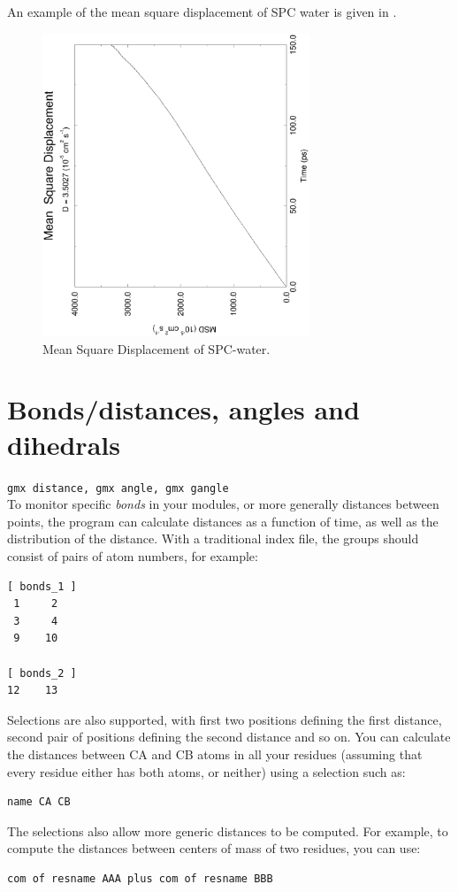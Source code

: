 An example of the mean square displacement of SPC water is given in
.

\begin{figure}
\centerline{
{\includegraphics[width=8cm]{plots/msdwater}}}
\caption{Mean Square Displacement of SPC-water.}
\label{fig:msdwater}
\end{figure}

% 
% 
\section{Bonds/distances, angles and dihedrals}
\label{sec:bad}
{\tt gmx distance, gmx angle, gmx gangle}\\
To monitor specific {\em bonds} in your modules, or more generally
distances between points, the program
{\tt {}} can calculate distances as a function of
time, as well as the distribution of the distance.
With a traditional index file, the groups should consist of pairs of
atom numbers, for example:
\begin{verbatim}
[ bonds_1 ]
 1     2
 3     4
 9    10

[ bonds_2 ]
12    13
\end{verbatim}
Selections are also supported, with first two positions defining the
first distance, second pair of positions defining the second distance
and so on.  You can calculate the distances between CA and CB atoms in
all your residues (assuming that every residue either has both atoms, or
neither) using a selection such as:
\begin{verbatim}
name CA CB
\end{verbatim}
The selections also allow more generic distances to be computed.
For example, to compute the distances between centers of mass of two
residues, you can use:
\begin{verbatim}
com of resname AAA plus com of resname BBB
\end{verbatim}

